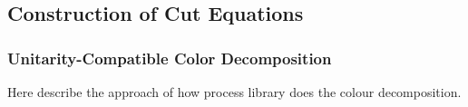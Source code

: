 \subsection{Construction of Cut Equations}


\subsubsection{Unitarity-Compatible Color Decomposition}
Here describe the approach of how process library does the colour decomposition.

\begin{figure}[ht] 
  \begin{center}
\end{center}
\end{figure}
